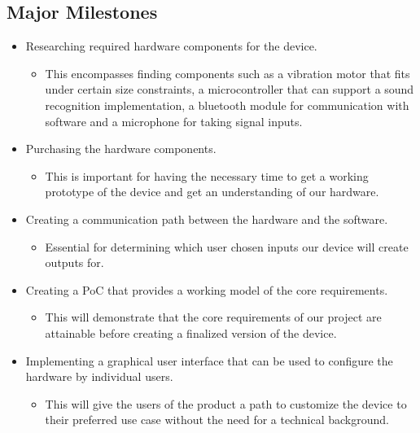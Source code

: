 \documentclass[12pt, titlepage]{article}
\begin{document}
\subsection*{Major Milestones}

\begin{itemize}
	\item Researching required hardware components for the device.
	\begin{itemize}
		\item This encompasses finding components such as a vibration motor that fits under certain size constraints, a microcontroller that can support a sound recognition implementation, a bluetooth module for communication with software and a microphone for taking signal inputs. 
	\end{itemize}
\end{itemize}

\begin{itemize}
	\item Purchasing the hardware components.
	\begin{itemize}
		\item This is important for having the necessary time to get a working prototype of the device and get an understanding of our hardware. 
	\end{itemize}
\end{itemize}

\begin{itemize}
	\item Creating a communication path between the hardware and the software.
	\begin{itemize}
		\item Essential for determining which user chosen inputs our device will create outputs for. 
	\end{itemize}
\end{itemize}

\begin{itemize}
	\item Creating a PoC that provides a working model of the core requirements.
	\begin{itemize}
		\item This will demonstrate that the core requirements of our project are attainable before creating a finalized version of the device. 
	\end{itemize}
\end{itemize}

\begin{itemize}
	\item Implementing a graphical user interface that can be used to configure the hardware by individual users.
	\begin{itemize}
		\item This will give the users of the product a path to customize the device to their preferred use case without the need for a technical background. 
	\end{itemize}
\end{itemize}
\end{document}
